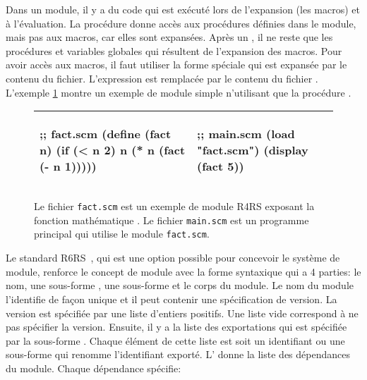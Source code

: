 Dans un module, il y a du code qui est exécuté lors de l'expansion (les macros)
et à l'évaluation. La procédure  donne accès aux procédures définies
dans le module, mais pas aux macros, car elles sont expansées.  Après un
, il ne reste que les procédures et variables globales qui
résultent de l'expansion des macros.  Pour avoir accès aux macros, il faut
utiliser la forme spéciale  qui est expansée par le contenu du
fichier.  L'expression  est remplacée par le
contenu du fichier . L'exemple \ref{fig:r4rs_fact} montre un
exemple de module simple n'utilisant que la procédure .

\begin{figure}[ht]
  \begin{center}
    \begin{tabular}{|l|l|}
    \hline
    \begin{mplisting}{0.4}
;; fact.scm
(define (fact n)
  (if (< n 2)
    n
    (* n (fact (- n 1)))))
\end{mplisting} &
    \begin{mplisting}{0.4}
;; main.scm
(load "fact.scm")
(display (fact 5))
\end{mplisting} \\\hline
    \end{tabular}
  \end{center}

  \caption{Le fichier \texttt{fact.scm} est un exemple de module R4RS exposant
  la fonction mathématique . Le fichier \texttt{main.scm} est un
  programme principal qui utilise le module \texttt{fact.scm}.}
  \label{fig:r4rs_fact}
\end{figure}



Le standard R6RS~\cite{Scheme:R6RS}, qui est une option possible pour concevoir
le système de module, renforce le concept de module avec la forme syntaxique
 qui a 4 parties: le nom, une sous-forme , une
sous-forme  et le corps du module. Le nom du module l'identifie
de façon unique et il peut contenir une spécification de version. La version
est spécifiée par une liste d'entiers positifs. Une liste vide \lstcode{()}
correspond à ne pas spécifier la version. Ensuite, il y a la liste des
exportations qui est spécifiée par la sous-forme . Chaque
élément de cette liste est soit un identifiant ou une sous-forme
 qui renomme l'identifiant exporté.  L' donne
la liste des dépendances du module. Chaque dépendance spécifie:

